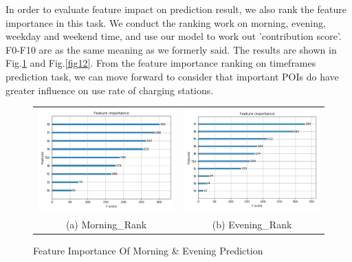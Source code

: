 \documentclass[runningheads]{llncs}
\begin{document}
In order to evaluate feature impact on prediction result, we also rank the feature importance in this task. We conduct the ranking work on morning, evening, weekday and weekend time, and use our model to work out 'contribution score'. F0-F10 are as the same meaning as we formerly said. The results are shown in Fig.\ref{fig11} and Fig.\ref{fig12}. From the feature importance ranking on timeframes prediction task, we can move forward to consider that important POIs do have greater influence on use rate of charging stations.
\begin{figure}[!htbp]
	\begin{tabular}{cc}
		\includegraphics[width=0.5\columnwidth]{./figures/morning_rank.pdf} &  \includegraphics[width=0.5\columnwidth]{./figures/evening_rank.pdf} \\
		(a) Morning\_Rank & (b) Evening\_Rank \\
	\end{tabular}
	\centering
	\caption{Feature Importance Of Morning \& Evening Prediction}
	\label{fig11}
\end{figure}
\end{document}

